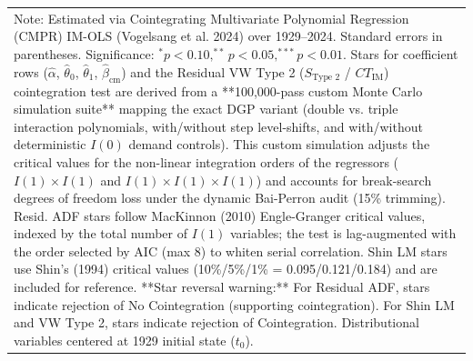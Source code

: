 \begin{table}[H]
\begin{tabular}{p{3.8cm}p{1.5cm}p{1.5cm}p{1.5cm}p{1.5cm}p{1.5cm}p{1.5cm}p{1.5cm}p{1.5cm}p{1.5cm}p{1.5cm}p{1.5cm}p{1.5cm}}
\multicolumn{13}{p{\linewidth}}{\footnotesize Note: Estimated via Cointegrating Multivariate Polynomial Regression (CMPR) IM-OLS (Vogelsang et al. 2024) over 1929--2024. Standard errors in parentheses. Significance: $^*p<0.10, ^{**}p<0.05, ^{***}p<0.01$. Stars for coefficient rows ($\hat{\alpha}$, $\hat{\theta}_0$, $\hat{\theta}_1$, $\hat{\beta}_{\text{cm}}$) and the Residual VW Type 2 ($S_{\text{Type 2}}$ / $CT_{\text{IM}}$) cointegration test are derived from a **100,000-pass custom Monte Carlo simulation suite** mapping the exact DGP variant (double vs. triple interaction polynomials, with/without step level-shifts, and with/without deterministic $I(0)$ demand controls). This custom simulation adjusts the critical values for the non-linear integration orders of the regressors ($I(1) \times I(1)$ and $I(1) \times I(1) \times I(1)$) and accounts for break-search degrees of freedom loss under the dynamic Bai-Perron audit (15\% trimming). Resid. ADF stars follow MacKinnon (2010) Engle-Granger critical values, indexed by the total number of $I(1)$ variables; the test is lag-augmented with the order selected by AIC (max 8) to whiten serial correlation. Shin LM stars use Shin's (1994) critical values (10\%/5\%/1\% = 0.095/0.121/0.184) and are included for reference. **Star reversal warning:** For Residual ADF, stars indicate rejection of No Cointegration (supporting cointegration). For Shin LM and VW Type 2, stars indicate rejection of Cointegration. Distributional variables centered at 1929 initial state ($t_0$).}
\end{tabular}
\end{table}
